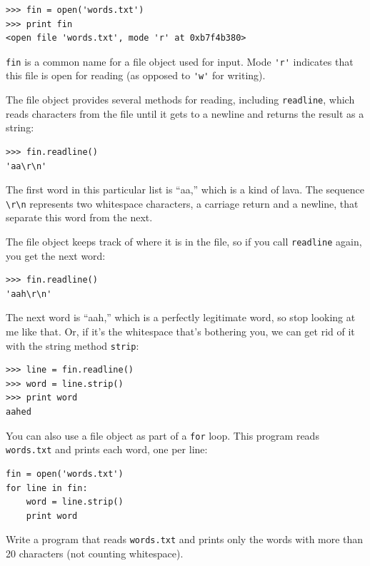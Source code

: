 \documentclass[10pt]{book}
\begin{document}
\begin{CJK}{UTF8}{gbsn}
\begin{verbatim}
>>> fin = open('words.txt')
>>> print fin
<open file 'words.txt', mode 'r' at 0xb7f4b380>
\end{verbatim}
%
{\tt fin} is a common name for a file object used for
input.  Mode \verb"'r'" indicates that this file is open for
reading (as opposed to \verb"'w'" for writing).

The file object provides several methods for reading, including
{\tt readline}, which reads characters from the file
until it gets to a newline and returns the result as a
string:

\begin{verbatim}
>>> fin.readline()
'aa\r\n'
\end{verbatim}
%
The first word in this particular list is ``aa,'' which is a kind of
lava.  The sequence \verb"\r\n" represents two whitespace characters,
a carriage return and a newline, that separate this word from the
next.

The file object keeps track of where it is in the file, so
if you call {\tt readline} again, you get the next word:

\begin{verbatim}
>>> fin.readline()
'aah\r\n'
\end{verbatim}
%
The next word is ``aah,'' which is a perfectly legitimate
word, so stop looking at me like that.
Or, if it's the whitespace that's bothering you,
we can get rid of it with the string method {\tt strip}:

\begin{verbatim}
>>> line = fin.readline()
>>> word = line.strip()
>>> print word
aahed
\end{verbatim}
%
You can also use a file object as part of a {\tt for} loop.
This program reads {\tt words.txt} and prints each word, one
per line:

\begin{verbatim}
fin = open('words.txt')
for line in fin:
    word = line.strip()
    print word
\end{verbatim}
%

\begin{exercise}

Write a program that reads {\tt words.txt} and prints only the
words with more than 20 characters (not counting whitespace).

\end{exercise}



\end{CJK}
\end{document}

